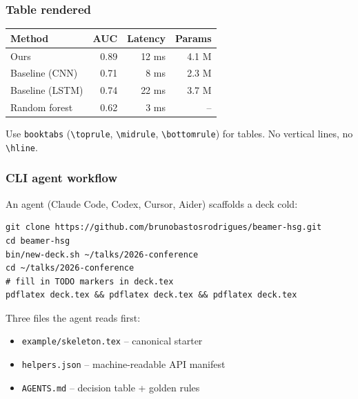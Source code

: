 \documentclass[aspectratio=169,xcolor=table]{beamer}
\begin{document}
\begin{frame}[t]
  \frametitle{Table rendered}

  \vspace{0.6em}
  \begin{center}
  \begin{tabular}{@{}lrrr@{}}
    \toprule
    \textbf{Method} & \textbf{AUC} & \textbf{Latency} & \textbf{Params} \\
    \midrule
    Ours              & 0.89 & 12 ms &  4.1 M \\
    Baseline (CNN)    & 0.71 &  8 ms &  2.3 M \\
    Baseline (LSTM)   & 0.74 & 22 ms &  3.7 M \\
    Random forest     & 0.62 &  3 ms &  --    \\
    \bottomrule
  \end{tabular}
  \end{center}

  \vspace{0.6em}
  \footnotesize Use \texttt{booktabs} (\texttt{\textbackslash toprule},
  \texttt{\textbackslash midrule}, \texttt{\textbackslash bottomrule})
  for tables. No vertical lines, no \texttt{\textbackslash hline}.
\end{frame}


\begin{frame}[t,fragile]
  \frametitle{CLI agent workflow}

  An agent (Claude Code, Codex, Cursor, Aider) scaffolds a deck cold:

  \begin{lstlisting}
git clone https://github.com/brunobastosrodrigues/beamer-hsg.git
cd beamer-hsg
bin/new-deck.sh ~/talks/2026-conference
cd ~/talks/2026-conference
# fill in TODO markers in deck.tex
pdflatex deck.tex && pdflatex deck.tex && pdflatex deck.tex
  \end{lstlisting}

  \vspace{0.4em}
  Three files the agent reads first:
  \begin{itemize}
    \setlength\itemsep{0.2em}
    \item \texttt{example/skeleton.tex} -- canonical starter
    \item \texttt{helpers.json} -- machine-readable API manifest
    \item \texttt{AGENTS.md} -- decision table + golden rules
  \end{itemize}
\end{frame}
\end{document}
